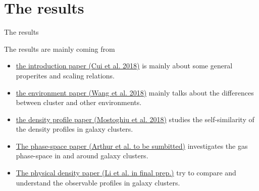 \documentclass[aspectratio=43]{beamer}
\begin{document}
\section{The results}
\begin{frame}
  \begin{center}
    {\Huge The results} \\
    \bigskip
  \end{center}

  The results are mainly coming from
  \begin{itemize}
      \item \hyperref{intropaper}{}{}{the introduction paper (Cui et al. 2018)} is mainly about some general properites and scaling relations.
      \item \hyperref{Wang}{}{}{the environment paper (Wang et al. 2018)}  mainly talks about the differences between cluster and other environments.
      \item \hyperref{Mostoghiu}{}{}{the density profile paper (Mostoghiu et al. 2018)} studies the self-similarity of the density profiles in galaxy clusters.
      \item \hyperref{Arthur}{}{}{The phase-space paper (Arthur et al. to be sumbitted)} investigates the gas phase-space in and around galaxy clusters.
      \item \hyperref{Li}{}{}{The physical density paper (Li et al. in final prep.)} try to compare and understand the observable profiles in galaxy clusters.
  \end{itemize}
\end{frame}
\end{document}
